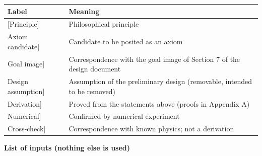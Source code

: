 \documentclass[
  a4paper,
]{article}
\newcounter{none} %
\begin{document}
{\def\LTcaptype{none} %
\begin{longtable}[]{@{}
  >{\raggedright\arraybackslash}p{}
  >{\raggedright\arraybackslash}p{}@{}}
\toprule\noalign{}
\begin{minipage}[b]{\linewidth}\raggedright
Label
\end{minipage} & \begin{minipage}[b]{\linewidth}\raggedright
Meaning
\end{minipage} \\
\midrule\noalign{}
\endhead
\bottomrule\noalign{}
\endlastfoot
{[}Principle{]} & Philosophical principle \\
{[}Axiom candidate{]} & Candidate to be posited as an axiom \\
{[}Goal image{]} & Correspondence with the goal image of Section 7 of
the design document \\
{[}Design assumption{]} & Assumption of the preliminary design
(removable, intended to be removed) \\
{[}Derivation{]} & Proved from the statements above (proofs in Appendix
A) \\
{[}Numerical{]} & Confirmed by numerical experiment \\
{[}Cross-check{]} & Correspondence with known physics; not a
derivation \\
\end{longtable}
}

\textbf{List of inputs (nothing else is used)}
\end{document}
